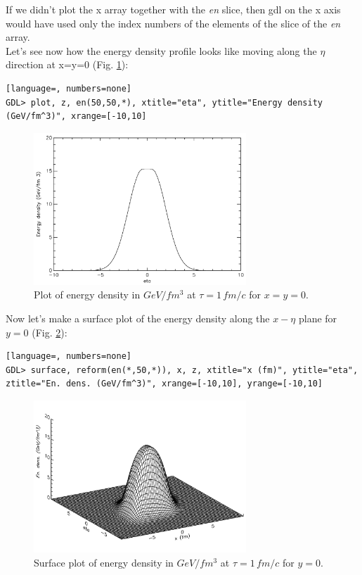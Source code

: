 If we didn't plot the x array together with the \emph{en} slice, then gdl on the x axis would have used only the index numbers of the elements of the slice of the \emph{en} array.\\
Let's see now how the energy density profile looks like moving along the $\eta$ direction at x=y=0 (Fig. \ref{fig:plot2}):
\begin{lstlisting}[language=, numbers=none]
GDL> plot, z, en(50,50,*), xtitle="eta", ytitle="Energy density (GeV/fm^3)", xrange=[-10,10]
\end{lstlisting}
\begin{figure}[!h]
 \begin{center}
  \includegraphics[width=8cm]{images/plot2.pdf}
   \caption{Plot of energy density in $GeV/fm^3$ at $\tau=1\,fm/c$ for $x=y=0$.}
    \label{fig:plot2}
 \end{center}
\end{figure}
Now let's make a surface plot of the energy density along the $x-\eta$ plane for $y=0$  (Fig. \ref{plot3}):
\begin{lstlisting}[language=, numbers=none]
GDL> surface, reform(en(*,50,*)), x, z, xtitle="x (fm)", ytitle="eta", ztitle="En. dens. (GeV/fm^3)", xrange=[-10,10], yrange=[-10,10]
\end{lstlisting}
\begin{figure}[!h]
 \begin{center}
  \includegraphics[width=8cm]{images/plot3.pdf}
   \caption{Surface plot of energy density in $GeV/fm^3$ at $\tau=1\,fm/c$ for $y=0$.}
    \label{plot3}
 \end{center}
\end{figure}
